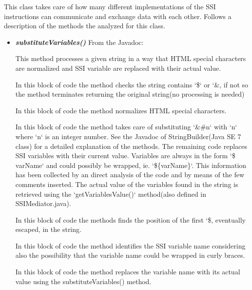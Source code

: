 \documentclass[11pt,titlepage]{article} %
\begin{document}
  \noindent This class takes care of
  how many different implementations of the SSI instructions can communicate and exchange data with each other.\newline
  Follows a description of the methods the analyzed for this class.
  \begin{itemize}
   \item \textbf{\textit{substituteVariables()}}
    \newline From the Javadoc:
    
    This method processes a given string in a way that HTML special characters are normalized and SSI variable are replaced with their
    actual value.
    
    In this block of code the method checks the string contains `\$` or `\&, if not so the method terminates returning the original string(no processing  is needed)
    
    
    In this block of code the method normalizes HTML special characters.
    
    
  
    In this block of code the method takes care of substituting `\&\#n` with `n` where `n` is an integer number.
    See the Javadoc of StringBuilder(Java SE 7 class) for a detailed explanation of the methods.\newline
    The remaining code replaces SSI variables with their current value.\newline
    Variables are always in the form `\$ varName` and could possibly be wrapped, ie. `\$\{varName\}`. 
    This information has been collected by an direct analysis of the code and by means of the few comments inserted. 
    The actual value of the variables found in the string is retrieved using the `getVariablesValue()` method(also defined in SSIMediator.java).\newline
    
    
    In this block of code the methods finds the position of the first `\$, eventually escaped, in the string.\newline
    
        
    In this block of code the method identifies the SSI variable name 
    considering also the possibility that the variable name could be wrapped in curly braces.
    
    
    In this block of code the method replaces the variable name with its actual value using the substituteVariables() method.
    

  \end{itemize}
\end{document}
